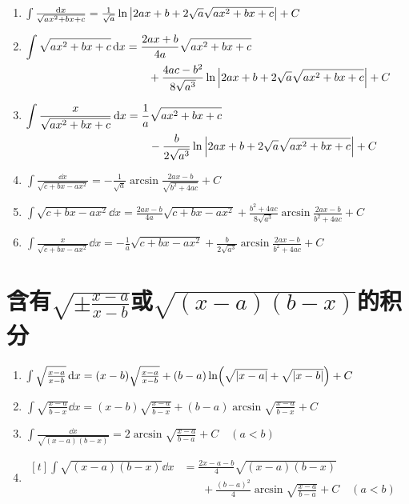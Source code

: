 \begin{enumerate}
\item \(\int \frac{\dd{x}}{\sqrt{ax^2+bx+c}} = \frac{1}{\sqrt{a}} \ln\abs{2ax+b+2\sqrt{a}\sqrt{ax^2+bx+c}} + C\)
\item \(\begin{aligned}[t]
\int \sqrt{ax^2+bx+c} \dd{x}
&= \frac{2ax+b}{4a} \sqrt{ax^2+bx+c} \\
&\hspace{20pt}+ \frac{4ac-b^2}{8\sqrt{a^3}} \ln\abs{2ax+b+2\sqrt{a}\sqrt{ax^2+bx+c}} + C
\end{aligned}\)
\item \(\begin{aligned}[t]
\int \frac{x}{\sqrt{ax^2+bx+c}} \dd{x}
&= \frac{1}{a}\sqrt{ax^2+bx+c} \\
&\hspace{20pt}- \frac{b}{2\sqrt{a^3}} \ln\abs{2ax+b+2\sqrt{a}\sqrt{ax^2+bx+c}} + C
\end{aligned}\)
\item \(\int \frac{\dd{x}}{\sqrt{c+bx-ax^2}} = -\frac{1}{\sqrt{a}} \arcsin\frac{2ax-b}{\sqrt{b^2+4ac}} + C\)
\item \(\int \sqrt{c+bx-ax^2} \dd{x} = \frac{2ax-b}{4a} \sqrt{c+bx-ax^2} + \frac{b^2+4ac}{8\sqrt{a^3}} \arcsin\frac{2ax-b}{b^2+4ac} + C\)
\item \(\int \frac{x}{\sqrt{c+bx-ax^2}} \dd{x} = -\frac{1}{a} \sqrt{c+bx-ax^2} + \frac{b}{2\sqrt{a^3}} \arcsin\frac{2ax-b}{b^2+4ac} + C\)
\end{enumerate}

\section*{含有\(\sqrt{\pm\frac{x-a}{x-b}}\)或\(\sqrt{(x-a)(b-x)}\)的积分}
\begin{enumerate}
\item \(\int \sqrt{\frac{x-a}{x-b}} \dd{x} = (x-b) \sqrt{\frac{x-a}{x-b}} + (b-a) \ln(\sqrt{\abs{x-a}} + \sqrt{\abs{x-b}}) + C\)
\item \(\int \sqrt{\frac{x-a}{b-x}} \dd{x} = (x-b) \sqrt{\frac{x-a}{b-x}} + (b-a) \arcsin\sqrt{\frac{x-a}{b-x}} + C\)
\item \(\int \frac{\dd{x}}{\sqrt{(x-a)(b-x)}} = 2\arcsin\sqrt{\frac{x-a}{b-a}} + C \quad(a<b)\)
\item \(\begin{aligned}[t]
\int \sqrt{(x-a)(b-x)} \dd{x}
&= \frac{2x-a-b}{4} \sqrt{(x-a)(b-x)} \\
&\hspace{20pt}+ \frac{(b-a)^2}{4} \arcsin\sqrt{\frac{x-a}{b-a}} + C \quad(a<b)
\end{aligned}\)
\end{enumerate}

